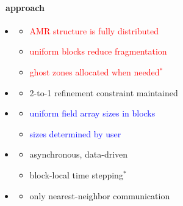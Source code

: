 \begin{frame}[fragile] 
\secframetitle{\ssApproach}
\framesubtitle{\enzopcello\ approach}
\begin{minipage}{3.0in}
\begin{itemize}
\item {}
\begin{itemize}
  \item<2-> \textcolor{red}{AMR structure is fully distributed}
  \item<2-> \textcolor{red}{uniform blocks reduce fragmentation}
  \item<2-> \textcolor{red}{ghost zones allocated when needed$^*$}
\end{itemize}
\item {}
\begin{itemize}
   \item<3-> \textcolor{green!80!black}{2-to-1 refinement constraint maintained}
\end{itemize}
\item {}
\begin{itemize}
   \item<4-> \textcolor{blue}{uniform field array sizes in blocks}
   \item<4-> \textcolor{blue}{sizes determined by user}
\end{itemize}
\item {}
\begin{itemize}
   \item<5-> \textcolor{cyan!80!black}{asynchronous, data-driven}
   \item<5-> \textcolor{cyan!80!black}{block-local time stepping$^*$}
\end{itemize}
\item {}
\begin{itemize}
   \item<6-> \textcolor{orange!80!black}{only nearest-neighbor communication}
\end{itemize}
\end{itemize}
\vspace{-0.1in}

\end{minipage}
\end{frame}
